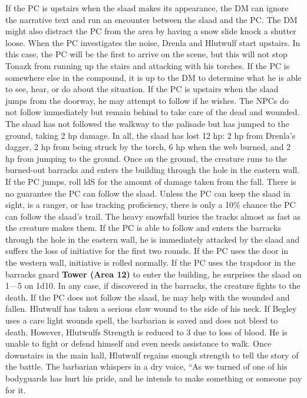 \documentclass[a5paper,11pt,twoside]{book}
\newcommand{\MapText}[1]{
	{\color{DarkCyan} \textbf{#1}}
}
\begin{document}
{{{{If the PC is upstairs when the slaad makes its appearance, the DM can ignore the narrative text and run an encounter between the slaad and the PC.
The DM might also distract the PC from the area by having a snow slide knock a shutter loose.
When the PC  investigates the noise, Drenla and Hlutwulf start upstairs.
In this case, the PC will be the first to arrive on the scene, but this will not stop Tonazk from running up the stairs and attacking with his torches.
If the PC is somewhere else in the compound, it is up to the DM to determine what he is able to see, hear, or do about the situation.
If the PC is upstairs when the slaad jumps from the doorway, he may attempt to follow if he wishes.
The NPCs do not follow immediately but remain behind to take care of the dead and wounded.
The slaad has not followed the walkway to the palisade but has jumped to the ground, taking 2 hp damage.
In all, the slaad has lost 12 hp: 2 hp from Drenla’s dagger, 2 hp from being struck by the torch, 6 hp when the web burned, and 2 hp from jumping to the ground.
Once on the ground, the creature runs to the burned-out barracks and enters the building through the hole in the eastern wall.
If the PC jumps, roll ldS for the amount of damage taken from the fall.
There is no guarantee the PC can follow the slaad.
Unless the PC can keep the slaad in sight, is a ranger, or has tracking proficiency, there is only a 10\% chance the PC can follow the slaad’s trail.
The heavy snowfall buries the tracks almost as fast as the creature makes them.
If the PC is able to follow and enters the barracks through the hole in the eastern wall, he is immediately attacked by the slaad and suffers the loss of initiative for the first two rounds.
If the PC uses the door in the western wall, initiative is rolled normally.
If the PC uses the trapdoor in the barracks gnard \MapText{Tower (Area 12)} to enter the building, he surprises the slaad on 1—5 on 1d10.
In any case, if discovered in the barracks, the creature fights to the death.
If the PC does not follow the slaad, he may help with the wounded and fallen.
Hlutwulf has taken a serious claw wound to the side of his neck.
If Begley uses a care light wounds spell, the barbarian is saved and does not bleed to death.
However, Hlutwulfs Strength is reduced to 3 due to loss of blood.
He is unable to fight or defend himself and even needs assistance to walk.
Once downstairs in the main hall, Hlutwulf regains enough strength to tell the story of the battle.
The barbarian whispers in a dry voice, “As we turned  of one of his bodyguards has hurt his pride, and he intends to make something or someone pay for it.
}}}}
\end{document}
